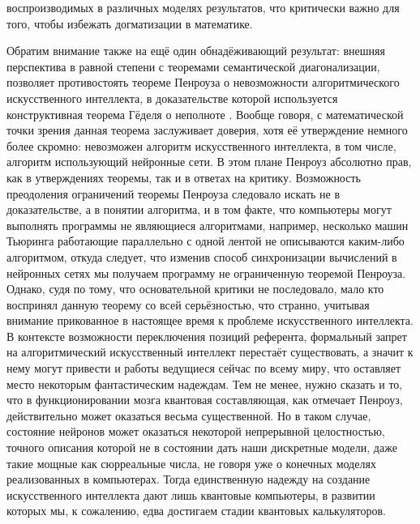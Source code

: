 \documentclass[12pt]{article}
\begin{document}
воспроизводимых в различных моделях результатов, что критически важно для того, чтобы избежать догматизации в математике.

Обратим внимание также на ещё один обнадёживающий результат: внешняя перспектива в равной степени с теоремами семантической диагонализации, позволяет противостоять теореме Пенроуза о невозможности алгоритмического искусственного интеллекта, в доказательстве которой используется конструктивная теорема Гёделя о неполноте \cite{penrose}. Вообще говоря, с математической точки зрения данная теорема заслуживает доверия, хотя её утверждение немного более скромно: невозможен алгоритм искусственного интеллекта, в том числе, алгоритм использующий нейронные сети. В этом плане Пенроуз абсолютно прав, как в утверждениях теоремы, так и в ответах на критику. Возможность преодоления ограничений теоремы Пенроуза следовало искать не в доказательстве, а в понятии алгоритма, и в том факте, что компьютеры могут выполнять программы не являющиеся алгоритмами, например, несколько машин Тьюринга работающие параллельно с одной лентой не описываются каким-либо алгоритмом, откуда следует, что изменив способ синхронизации вычислений в нейронных сетях мы получаем программу не ограниченную теоремой Пенроуза. Однако, судя по тому, что основательной критики не последовало, мало кто воспринял данную теорему со всей серьёзностью, что странно, учитывая внимание прикованное в настоящее время к проблеме искусственного интеллекта. В контексте возможности переключения позиций референта, формальный запрет на алгоритмический искусственный интеллект перестаёт существовать, а значит к нему могут привести и работы ведущиеся сейчас по всему миру, что оставляет место некоторым фантастическим надеждам. Тем не менее, нужно сказать и то, что в функционировании мозга квантовая составляющая, как отмечает Пенроуз, действительно может оказаться весьма существенной. Но в таком случае, состояние нейронов может оказаться некоторой непрерывной целостностью, точного описания которой не в состоянии дать наши дискретные модели, даже такие мощные как  сюрреальные числа, не говоря уже о конечных моделях реализованных в компьютерах. Тогда единственную надежду на создание искусственного интеллекта дают лишь квантовые компьютеры, в развитии которых мы, к сожалению, едва достигаем стадии квантовых калькуляторов.
\end{document}
